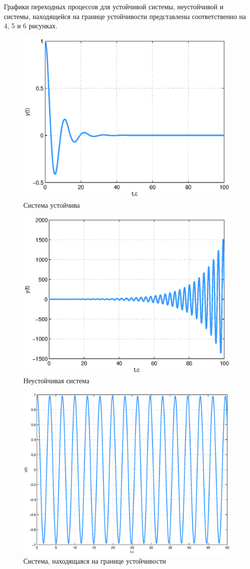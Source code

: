 \documentclass[12pt,a4paper]{article}
\begin{document}
Графики переходных процессов для устойчивой системы, неустойчивой и системы, находящейся на границе устойчивости представлены соответственно на 4, 5 и 6 рисунках.
\begin{figure}[H]
	\centering
	\includegraphics[width=0.8\linewidth]{scheme/plot1.eps}
	\caption{Система устойчива}
\end{figure}
\begin{figure}[H]
	\centering
	\includegraphics[width=0.8\linewidth]{scheme/plot2.eps}
	\caption{Неустойчивая система}
\end{figure}
\begin{figure}[H]
	\centering
	\includegraphics[width=0.8\linewidth]{scheme/plot3.eps}
	\caption{Система, находящаяся на границе устойчивости}
\end{figure}
\end{document}
